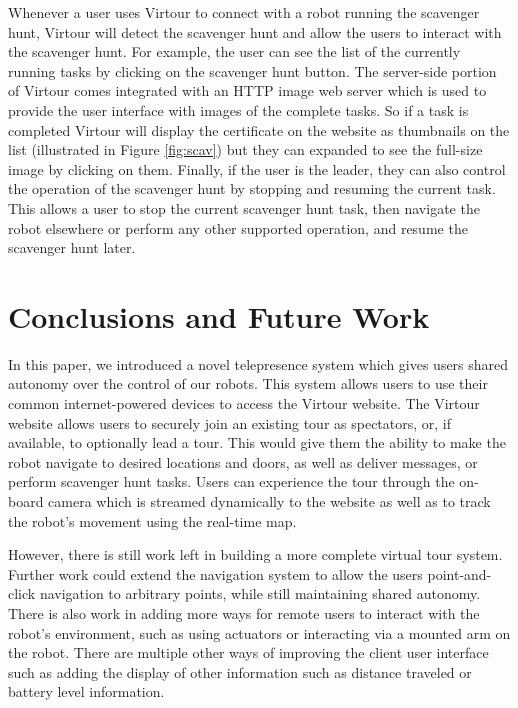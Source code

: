 \documentclass[
  oneside,
  11pt, a4paper,
  footinclude=true,
  headinclude=true,
  cleardoublepage=empty
]{article}
\begin{document}
Whenever a user uses Virtour to connect with a robot running the scavenger
hunt, Virtour will detect the scavenger hunt and allow the users to interact
with the scavenger hunt. For example, the user can see the list of the
currently running tasks by clicking on the scavenger hunt button. The
server-side portion of Virtour comes integrated with an HTTP image web server
which is used to provide the user interface with images of the complete tasks.
So if a task is completed Virtour will display the certificate on the website
as thumbnails on the list (illustrated in Figure \ref{fig:scav}) but they can
expanded to see the full-size image by clicking on them. Finally, if the user
is the leader, they can also control the operation of the scavenger hunt by
stopping and resuming the current task. This allows a user to stop the current
scavenger hunt task, then navigate the robot elsewhere or perform any other
supported operation, and resume the scavenger hunt later.

\section{Conclusions and Future Work}\label{sec:conclusion}

In this paper, we introduced a novel telepresence system which gives users
shared autonomy over the control of our robots. This system allows users to use
their common internet-powered devices to access the Virtour website. The
Virtour website allows users to securely join an existing tour as spectators,
or, if available, to optionally lead a tour. This would give them the ability
to make the robot navigate to desired locations and doors, as well as deliver
messages, or perform scavenger hunt tasks. Users can experience the tour
through the on-board camera which is streamed dynamically to the website as
well as to track the robot's movement using the real-time map.

However, there is still work left in building a more complete virtual tour
system. Further work could extend the navigation system to allow the users
point-and-click navigation to arbitrary points, while still maintaining shared
autonomy. There is also work in adding more ways for remote users to interact
with the robot's environment, such as using actuators or interacting via a
mounted arm on the robot. There are multiple other ways of improving the client
user interface such as adding the display of other information such as distance
traveled or battery level information.
\end{document}
